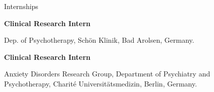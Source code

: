 \begin{rubric}{Internships}


\textbf{Clinical Research Intern} \par Dep. of Psychotherapy, Sch\"on Klinik, Bad Arolsen, Germany.

\textbf{Clinical Research Intern} \par Anxiety Disorders Research Group, Department of Psychiatry and Psychotherapy, Charit\'e Universit\"atsmedizin, Berlin, Germany.

\end{rubric}
